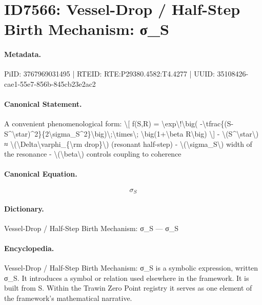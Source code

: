 \section*{ID7566: Vessel-Drop / Half-Step Birth Mechanism: σ\_S}
\paragraph{Metadata.}
PiID: 3767969031495 | RTEID: RTE:P29380.4582:T4.4277 | UUID: 35108426-cae1-55e7-856b-845cb23e2ac2

\paragraph{Canonical Statement.}
A convenient phenomenological form: \textbackslash{}[ f(S,R) = \textbackslash{}exp\textbackslash{}!\textbackslash{}big( -\textbackslash{}tfrac\{(S-S\textasciicircum{}\textbackslash{}star)\textasciicircum{}2\}\{2\textbackslash{}sigma\_S\textasciicircum{}2\}\textbackslash{}big)\textbackslash{};\textbackslash{}times\textbackslash{}; \textbackslash{}big(1+\textbackslash{}beta R\textbackslash{}big) \textbackslash{}] - \textbackslash{}(S\textasciicircum{}\textbackslash{}star\textbackslash{}) ≈ \textbackslash{}(\textbackslash{}Delta\textbackslash{}varphi\_\{\textbackslash{}rm drop\}\textbackslash{}) (resonant half-step) - \textbackslash{}(\textbackslash{}sigma\_S\textbackslash{}) width of the resonance - \textbackslash{}(\textbackslash{}beta\textbackslash{}) controls coupling to coherence

\paragraph{Canonical Equation.}
\[
\sigma_S
\]

\paragraph{Dictionary.}
Vessel-Drop / Half-Step Birth Mechanism: σ\_S — σ\_S

\paragraph{Encyclopedia.}
Vessel-Drop / Half-Step Birth Mechanism: σ\_S is a symbolic expression, written σ\_S. It introduces a symbol or relation used elsewhere in the framework. It is built from S. Within the Trawin Zero Point registry it serves as one element of the framework's mathematical narrative.

